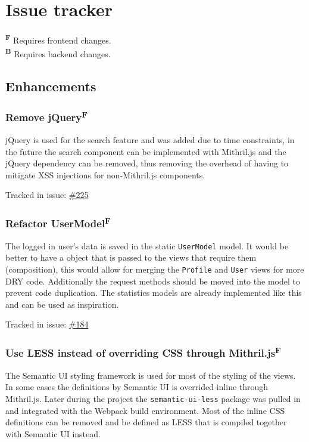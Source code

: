 \documentclass[12pt,a4paper]{report}
\begin{document}
\newpage
\section{Issue tracker}
\label{sec:issue-tracker}
\textbf{\textsuperscript{F}} Requires frontend changes. \\
\textbf{\textsuperscript{B}} Requires backend changes.

\subsection*{Enhancements}
\subsubsection{Remove jQuery\texorpdfstring{\textsuperscript{F}}{}}
\label{subsec:remove-jquery}
jQuery is used for the search feature and was added due to time constraints, in the future the search component can be implemented with Mithril.js and the jQuery dependency can be removed, thus removing the overhead of having to mitigate XSS injections for non-Mithril.js components.

Tracked in issue: \href{https://github.com/LuleaUniversityOfTechnology/2018-project-roaster/issues/225}{\#225}

\subsubsection{Refactor UserModel\texorpdfstring{\textsuperscript{F}}{}}
The logged in user's data is saved in the static \texttt{UserModel} model. It would be better to have a object that is passed to the views that require them (composition), this would allow for merging the \texttt{Profile} and \texttt{User} views for more DRY\cite{dry} code. Additionally the request methods should be moved into the model to prevent code duplication. The statistics models are already implemented like this and can be used as inspiration.

Tracked in issue: \href{https://github.com/LuleaUniversityOfTechnology/2018-project-roaster/issues/184}{\#184}

\subsubsection{Use LESS instead of overriding CSS through Mithril.js\texorpdfstring{\textsuperscript{F}}{}}
The Semantic UI styling framework is used for most of the styling of the views. In some cases the definitions by Semantic UI is overrided inline through Mithril.js. Later during the project the \texttt{semantic-ui-less} package was pulled in and integrated with the Webpack build environment. Most of the inline CSS definitions can be removed and be defined as LESS that is compiled together with Semantic UI instead.
\end{document}
